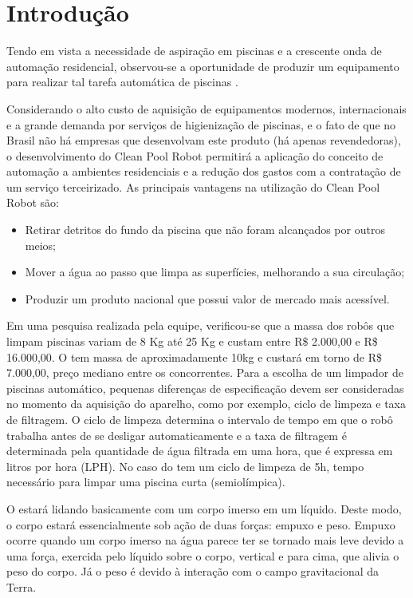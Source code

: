 \chapter{Introdução} \label{ch:introduction}
Tendo em vista a necessidade de aspiração em piscinas e a crescente onda de automação residencial, observou-se a oportunidade de produzir um equipamento para realizar tal tarefa automática de piscinas \cite{kanno2014}.

Considerando o alto custo de aquisição de equipamentos modernos, internacionais e a grande demanda por serviços de higienização de piscinas, e o fato de que no Brasil não há empresas que desenvolvam este produto (há apenas revendedoras), o desenvolvimento do Clean Pool Robot permitirá a aplicação do conceito de automação a ambientes residenciais e a redução dos gastos com a contratação de um serviço terceirizado. As principais vantagens na utilização do Clean Pool Robot são:

\begin{itemize}
\item Retirar detritos do fundo da piscina que não foram alcançados por outros meios;
\item Mover a água ao passo que limpa as superfícies, melhorando a sua circulação;
\item Produzir um produto nacional que possui valor de mercado mais acessível.
\end{itemize}

Em uma pesquisa realizada pela equipe, verificou-se que a massa dos robôs que limpam piscinas variam de 8 Kg até 25 Kg e custam entre R\$ 2.000,00 e R\$ 16.000,00. O \cpr tem massa de aproximadamente 10kg e custará em torno de R\$ 7.000,00, preço mediano entre os concorrentes. Para a escolha de um limpador de piscinas automático, pequenas diferenças de especificação devem ser consideradas no momento da aquisição do aparelho, como por exemplo, ciclo de limpeza e taxa de filtragem. O ciclo de limpeza determina o intervalo de tempo em que o robô trabalha antes de se desligar automaticamente e a taxa de filtragem é determinada pela quantidade de água filtrada em uma hora, que é expressa em litros por hora (LPH). No caso do \cpr tem um ciclo de limpeza de 5h, tempo necessário para limpar uma piscina curta (semiolímpica).

O \cpr estará lidando basicamente com um corpo imerso em um líquido. Deste modo, o corpo estará essencialmente sob ação de duas forças: empuxo e peso.  Empuxo ocorre quando um corpo imerso na água parece ter se tornado mais leve devido a uma força, exercida pelo líquido sobre o corpo, vertical e para cima, que alivia o peso do corpo. Já o peso é devido à interação com o campo gravitacional da Terra.

